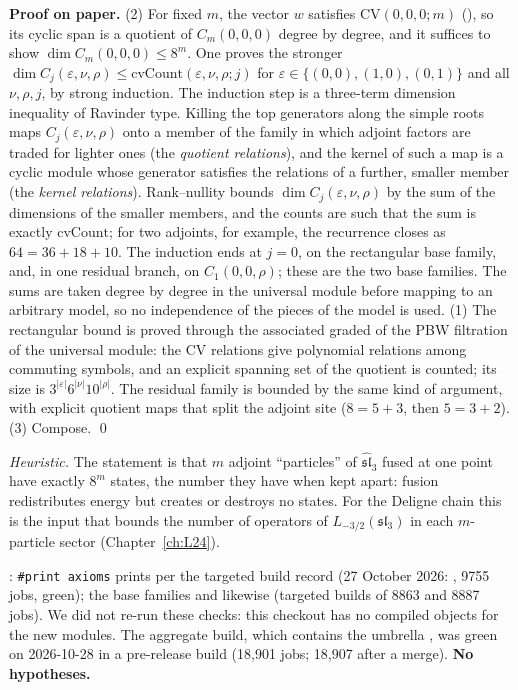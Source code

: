 \textbf{Proof on paper.} (2) For fixed $m$, the vector $w$ satisfies $\mathrm{CV}(0,0,0;m)$ (), so its cyclic span
is a quotient of $C_m(0,0,0)$ degree by degree, and it suffices to show $\dim C_m(0,0,0)\le8^m$. One proves the stronger
$\dim C_j(\varepsilon,\nu,\rho)\le\mathrm{cvCount}(\varepsilon,\nu,\rho;j)$ for $\varepsilon\in\{(0,0),(1,0),(0,1)\}$ and all
$\nu,\rho,j$, by strong induction. The induction step is a three-term dimension inequality of Ravinder type. Killing the
top generators along the simple roots maps $C_j(\varepsilon,\nu,\rho)$ onto a member of the family in which adjoint factors are
traded for lighter ones (the \emph{quotient relations}), and the kernel of such a map is a cyclic module whose generator satisfies the
relations of a further, smaller member (the \emph{kernel relations}). Rank--nullity bounds $\dim C_j(\varepsilon,\nu,\rho)$ by the sum
of the dimensions of the smaller members, and the counts are such that the sum is exactly $\mathrm{cvCount}$; for two adjoints, for
example, the recurrence closes as $64=36+18+10$. The induction ends at $j=0$, on the rectangular base family, and, in one residual
branch, on $C_1(0,0,\rho)$; these are the two base families. The sums are taken degree by degree in the universal module before
mapping to an arbitrary model, so no independence of the pieces of the model is used.
(1) The rectangular bound is proved through the associated graded of the PBW filtration of the universal module: the CV relations
give polynomial relations among commuting symbols, and an explicit spanning set of the quotient is counted; its size is
$3^{|\varepsilon|}6^{|\nu|}10^{|\rho|}$. The residual family is bounded by the same kind of argument, with explicit quotient maps
that split the adjoint site ($8=5+3$, then $5=3+2$). (3) Compose. \qed

\begin{physics}
\emph{Heuristic.} The statement is that $m$ adjoint ``particles'' of $\widehat{\mathfrak{sl}}_3$ fused at one point have exactly
$8^m$ states, the number they have when kept apart: fusion redistributes energy but creates or destroys no states. For the
Deligne chain this is the input that bounds the number of operators of $L_{-3/2}(\mathfrak{sl}_3)$ in each $m$-particle sector
(Chapter~\ref{ch:L24}).
\end{physics}

\begin{status}
: \texttt{\#print axioms} prints  per the targeted
build record (27 October 2026: , 9755 jobs, green); the base families
 and  likewise (targeted builds of 8863 and 8887 jobs). We did not re-run
these checks: this checkout has no compiled objects for the new modules. The aggregate build, which contains the umbrella ,
was green on 2026-10-28 in a pre-release build (18{,}901 jobs; 18{,}907 after a merge). \textbf{No hypotheses.}
\end{status}

